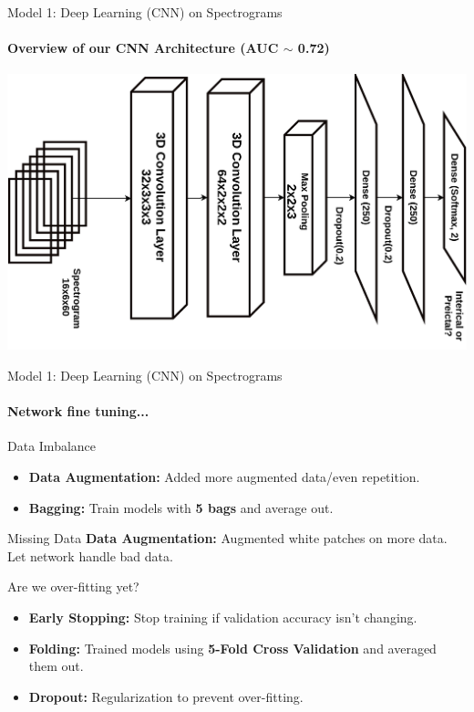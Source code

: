 \documentclass{beamer}
\begin{document}
\begin{frame}{Model 1: Deep Learning (CNN) on Spectrograms}
  \framesubtitle{Overview of our CNN Architecture (AUC $\sim$ 0.72)}
  \begin{center}
  \includegraphics*[scale=0.175]{img/cnn_arch.png}
  \end{center}
\end{frame}



\begin{frame}{Model 1: Deep Learning (CNN) on Spectrograms}
  \framesubtitle{Network fine tuning...}

  \begin{block}{Data Imbalance}
    \begin{itemize}
    \item \textbf{Data Augmentation:} Added more augmented data/even repetition.
    \item \textbf{Bagging:} Train models with \textbf{5 bags} and average out.
    \end{itemize}
  \end{block}
  
  \begin{block}{Missing Data}
    \textbf{Data Augmentation:} Augmented white patches on more data. Let
    network handle bad data.
  \end{block}
 
  \begin{block}{Are we over-fitting yet?}
    \begin{itemize}

\item     \textbf{Early Stopping:} Stop training if validation accuracy isn't
    changing.
    \item \textbf{Folding:} Trained models using \textbf{5-Fold Cross Validation} and
    averaged them out.
    \item \textbf{Dropout:} Regularization to prevent over-fitting.
    \end{itemize}
  \end{block}
\end{frame}
\end{document}
